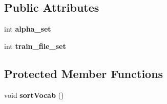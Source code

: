 \subsection*{Public Attributes}
\begin{DoxyCompactItemize}
\item 
\mbox{\label{class_c_rnn_l_m_aaa1c6246328fe64ae21c875efb33d01a}} 
int {\bfseries alpha\+\_\+set}
\item 
\mbox{\label{class_c_rnn_l_m_a348e6dd4967b76c41e82b98d7ece17fe}} 
int {\bfseries train\+\_\+file\+\_\+set}
\end{DoxyCompactItemize}
\subsection*{Protected Member Functions}
\begin{DoxyCompactItemize}
\item 
\mbox{\label{class_c_rnn_l_m_a1ddfb1f8b9e511d028409900fa3197fa}} 
void {\bfseries sort\+Vocab} ()
\end{DoxyCompactItemize}
